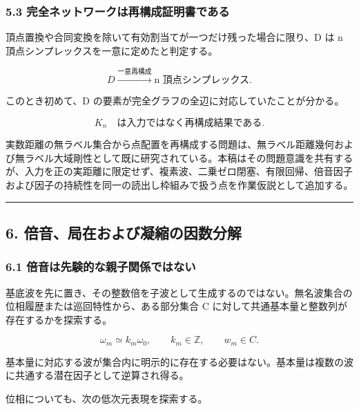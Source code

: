 \documentclass[
  a4paper,
]{ltjsarticle}
\begin{document}
\subsubsection{5.3
完全ネットワークは再構成証明書である}\label{ux5b8cux5168ux30cdux30c3ux30c8ux30efux30fcux30afux306fux518dux69cbux6210ux8a3cux660eux66f8ux3067ux3042ux308b}

頂点置換や合同変換を除いて有効割当てが一つだけ残った場合に限り、D は n
頂点シンプレックスを一意に定めたと判定する。

\[
D
\xrightarrow{\text{一意再構成}}
\text{n 頂点シンプレックス}.
\]

このとき初めて、D の要素が完全グラフの全辺に対応していたことが分かる。

\[
K_n
\quad\text{は入力ではなく再構成結果である}.
\]

実数距離の無ラベル集合から点配置を再構成する問題は、無ラベル距離幾何および無ラベル大域剛性として既に研究されている。本稿はその問題意識を共有するが、入力を正の実距離に限定せず、複素波、二乗ゼロ閉塞、有限回帰、倍音因子および因子の持続性を同一の読出し枠組みで扱う点を作業仮説として追加する。

\begin{center}\rule{0.5\linewidth}{0.5pt}\end{center}

\subsection{6.
倍音、局在および凝縮の因数分解}\label{ux500dux97f3ux5c40ux5728ux304aux3088ux3073ux51ddux7e2eux306eux56e0ux6570ux5206ux89e3}

\subsubsection{6.1
倍音は先験的な親子関係ではない}\label{ux500dux97f3ux306fux5148ux9a13ux7684ux306aux89aaux5b50ux95a2ux4fc2ux3067ux306fux306aux3044}

基底波を先に置き、その整数倍を子波として生成するのではない。無名波集合の位相履歴または巡回特性から、ある部分集合
C に対して共通基本量と整数列が存在するかを探索する。

\[
\omega_m
\simeq
k_m\omega_0,
\qquad
k_m\in\mathbb Z,
\qquad
w_m\in C.
\]

基本量に対応する波が集合内に明示的に存在する必要はない。基本量は複数の波に共通する潜在因子として逆算され得る。

位相についても、次の低次元表現を探索する。
\end{document}
